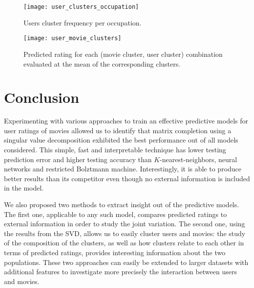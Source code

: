\documentclass[bj, preprint]{imsart}
\begin{document}
\begin{figure}[t!]
	\centering
	\texttt{[image: user\_clusters\_occupation]}
	\caption{Users cluster frequency per occupation.\label{fig:explore.cluster.occupation}}
\end{figure}

\begin{figure}[t!]
	\centering
	\texttt{[image: user\_movie\_clusters]}
	\caption{Predicted rating for each (movie cluster, user cluster) combination evaluated at the mean of the corresponding clusters.\label{fig:explore.cluster.pairs}}
\end{figure}
\section{Conclusion}\label{sec:conc}

Experimenting with various approaches to train an effective predictive models for user ratings of movies allowed us to identify that matrix completion using a singular value decomposition exhibited the best performance out of all models considered. This simple, fast and interpretable technique has lower testing prediction error and higher testing accuracy than $K$-nearest-neighbors, neural networks and restricted Bolztmann machine. Interestingly, it is able to produce better results than its competitor even though no external information is included in the model. 

We also proposed two methods to extract insight out of the predictive models. The first one, applicable to any such model, compares predicted ratings to external information in order to study the joint variation. The second one, using the results from the SVD, allows us to easily cluster users and movies: the study of the composition of the clusters, as well as how clusters relate to each other in terms of predicted ratings, provides interesting information about the two populations. These two approaches can easily be extended to larger datasets with additional features to investigate more precisely the interaction between users and movies.



\clearpage
\newpage

{}


\clearpage
\newpage
\appendix 
\end{document}
